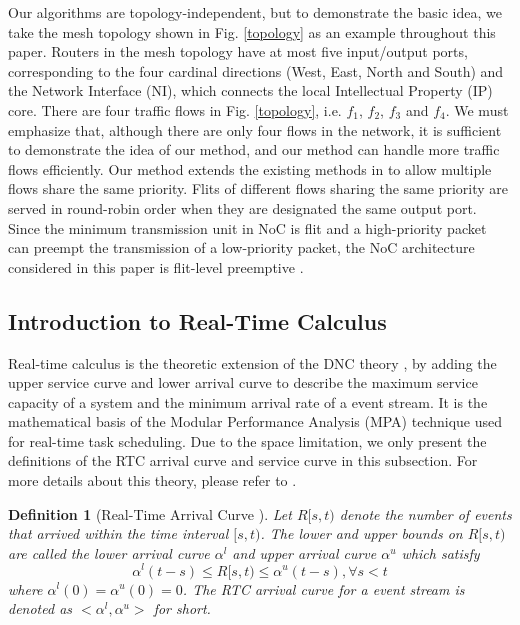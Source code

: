 \documentclass[10pt,journal]{IEEEtran}
\newtheorem{definition}{Definition}
\begin{document}
Our algorithms are topology-independent, but to demonstrate the basic idea, we take the mesh topology shown in Fig. \ref{topology} as an example throughout this paper. Routers in the mesh topology have at most five input/output ports, corresponding to the four cardinal directions (West, East, North and South) and the Network Interface (NI), which connects the local Intellectual Property (IP) core. There are four traffic flows in Fig. \ref{topology}, i.e. $f_1$, $f_2$, $f_3$ and $f_4$. We must emphasize that, although there are only four flows in the network, it is sufficient to demonstrate the idea of our method, and our method can handle more traffic flows efficiently. Our method extends the existing methods in \cite{73}\cite{Qian489900} to allow multiple flows share the same priority. Flits of different flows sharing the same priority are served in round-robin order when they are designated the same output port. Since the minimum transmission unit in NoC is flit and a high-priority packet can preempt the transmission of a low-priority packet, the NoC architecture considered in this paper is flit-level preemptive \cite{Lee:2003:RWC:846077.846083}.

\subsection{Introduction to Real-Time Calculus}\label{intrortc}
Real-time calculus \cite{1253607} is the theoretic extension of the DNC theory \cite{Boudec2001Network}, by adding the upper service curve and lower arrival curve to describe the maximum service capacity of a system and the minimum arrival rate of a event stream. It is the mathematical basis of the Modular Performance Analysis (MPA) \cite{Wandeler2006System} technique used for real-time task scheduling. Due to the space limitation, we only present the definitions of the RTC arrival curve and service curve in this subsection. For more details about this theory, please refer to \cite{1253607}.
\begin{definition}[Real-Time Arrival Curve \cite{1253607}]
Let $R[s,t)$ denote the number of events that arrived within the time interval $[s,t)$. The lower and upper bounds on $R[s,t)$ are called the lower arrival curve $\alpha^l$ and upper arrival curve $\alpha^u$ which satisfy
$$\alpha^l(t-s)\leq R[s,t)\leq \alpha^u(t-s),\forall s<t$$
where $\alpha^l(0)=\alpha^u(0)=0$. The RTC arrival curve for a event stream is denoted as $<\alpha^l,\alpha^u>$ for short.
\end{definition}
\end{document}
